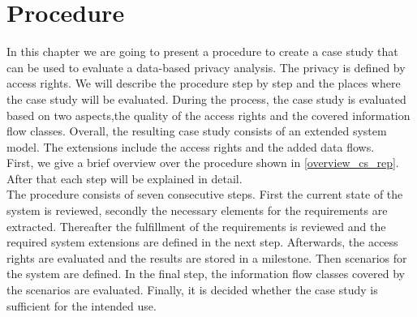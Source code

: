 \chapter{Procedure}
\label{ch:method}

In this chapter we are going to present a procedure to create a case study that can be used to evaluate a data-based privacy analysis. The privacy is defined by access rights. We will describe the procedure step by step and the places where the case study will be evaluated. During the process, the case study is evaluated based on two aspects,the quality of the access rights and the covered information flow classes. Overall, the resulting case study consists of an extended system model. The extensions include the access rights and the added data flows. \\
First, we give a brief overview over the procedure shown in \autoref{overview_cs_rep}. After that each step will be explained in detail. \\ 
The procedure consists of seven consecutive steps. First the current state of the system is reviewed, secondly the necessary elements for the requirements are extracted. Thereafter the fulfillment of the requirements is reviewed and the required system extensions are defined in the next step. Afterwards, the access rights are evaluated and the results are stored in a milestone. Then scenarios for the system are defined. In the final step, the information flow classes covered by the scenarios are evaluated. Finally, it is decided whether the case study is sufficient for the intended use. 
